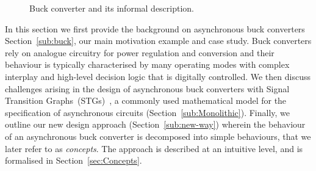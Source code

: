 \documentclass[british, journal]{IEEEtran}
\begin{document}
\begin{figure}[t]
\begin{centering}
\par
{}
\par
\end{centering}
\protect\caption{\label{fig:buck}Buck converter and its informal description.}
\vspace{-3mm}
\end{figure}

In this section we first provide the background on asynchronous buck
converters Section~\ref{sub:buck}, our main motivation example and case study.
Buck converters rely on analogue circuitry for power regulation and
conversion and their behaviour is typically characterised by many operating
modes with complex interplay and high-level decision logic that is digitally
controlled.
We then discuss challenges arising in the design of asynchronous buck converters
with Signal Transition Graphs~(STGs)~\cite{Chu_1987_phd}\cite{Rosenblum_1985_tpn},
a commonly used mathematical model for the specification of asynchronous
circuits (Section~\ref{sub:Monolithic}).
Finally, we outline our new design approach (Section~\ref{sub:new-way}) wherein
the behaviour of an asynchronous buck converter is decomposed into simple
behaviours, that we later refer to as \emph{concepts}. The approach is
described at an intuitive level, and is formalised in Section~\ref{sec:Concepts}.
\end{document}
